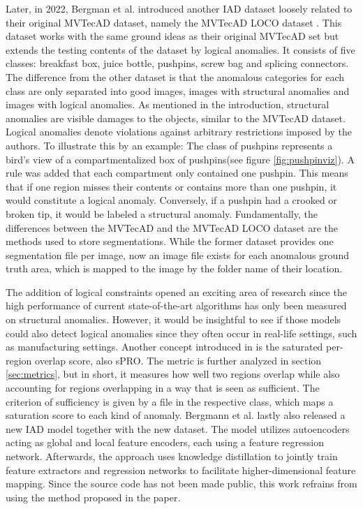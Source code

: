 Later, in 2022, Bergman et al. introduced another IAD dataset loosely related to their original MVTecAD dataset, namely the MVTecAD LOCO dataset \cite{LOCODentsAndScratchesBergmann2022}. 
This dataset works with the same ground ideas as their original MVTecAD set but extends the testing contents of the dataset by logical anomalies. 
It consists of five classes: breakfast box, juice bottle, pushpins, screw bag and splicing connectors. The difference from the other dataset is that the anomalous categories for each class are only separated into good images, images with structural anomalies 
and images with logical anomalies. As mentioned in the introduction, structural anomalies are visible damages to the objects, similar to the MVTecAD dataset. Logical anomalies denote violations against arbitrary restrictions 
imposed by the authors. To illustrate this by an example: The class of pushpins represents a bird's view of a compartmentalized box of pushpins(see figure \ref{fig:pushpinviz}). A rule was added 
that each compartment only contained one pushpin. This means that if one region misses their contents or contains more than one pushpin, it would constitute a logical anomaly. Conversely, if a pushpin had a crooked or broken tip, it would be labeled a structural anomaly. Fundamentally, the differences between the 
MVTecAD and the MVTecAD LOCO dataset are the methods used to store segmentations. While the former dataset provides one segmentation file per image, now an image file exists for each anomalous ground truth area, which is mapped to the image by the folder name of their location.




The addition of logical constraints opened an exciting area of research since the high performance 
of current state-of-the-art algorithms has only been measured on structural anomalies. However, it would be insightful to see if those models could also detect logical anomalies since they often occur 
in real-life settings, such as manufacturing settings. Another concept introduced in \cite{LOCODentsAndScratchesBergmann2022} is the 
saturated per-region overlap score, also sPRO. The metric is further analyzed in section \ref{sec:metrics}, but in short, it measures how well two regions overlap while also accounting for regions overlapping in a way that is seen as sufficient. The criterion of 
sufficiency is given by a file in the respective class, which maps a saturation score to each kind of anomaly.
Bergmann et al.\cite{LOCODentsAndScratchesBergmann2022} lastly also released a new IAD model together with the new dataset. The model utilizes autoencoders acting 
as global and local feature encoders, each using a feature regression network. Afterwards, the approach uses knowledge distillation to jointly train 
feature extractors and regression networks to facilitate higher-dimensional feature mapping. Since the source code has not been made public, 
this work refrains from using the method proposed in the paper.


